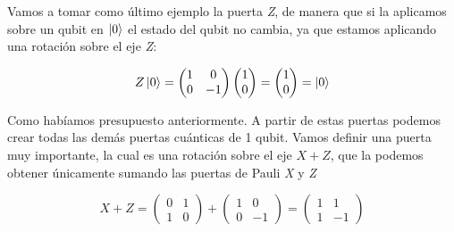 \documentclass{article}
\numberwithin{equation}{section} %
\begin{document}
    \begin{minipage}{0.1\textwidth}
        \hfill
    \end{minipage}

    \vspace{5mm}

    Vamos a tomar como último ejemplo la puerta \textit{Z}, de manera que si la aplicamos sobre un qubit en \( \ket{0} \)
    el estado del qubit no cambia, ya que estamos aplicando una rotación sobre el eje \textit{Z}:

    \begin{equation*}
        Z \ket{0} = \begin{pmatrix}
            1 & 0 \\
            0 & -1
        \end{pmatrix} \begin{pmatrix}
            1 \\
            0
        \end{pmatrix} = \begin{pmatrix}
            1 \\
            0
        \end{pmatrix} = \ket{0}
    \end{equation*}

    \vspace{2.5mm}

    Como habíamos presupuesto anteriormente. A partir de estas puertas podemos crear todas las demás puertas cuánticas de 1 qubit. Vamos definir una puerta muy importante, la cual es una rotación sobre el eje \( X + Z \), que la podemos obtener únicamente sumando las puertas de Pauli \textit{X} y \textit{Z}

    \begin{equation*}
        X + Z = \begin{pmatrix}
            0 & 1 \\
            1 & 0 
        \end{pmatrix} + \begin{pmatrix}
            1 & 0 \\
            0 & -1
        \end{pmatrix} = \begin{pmatrix}
            1 & 1 \\
            1 & -1
        \end{pmatrix}
    \end{equation*}

    \vspace{2.5mm}
\end{document}
